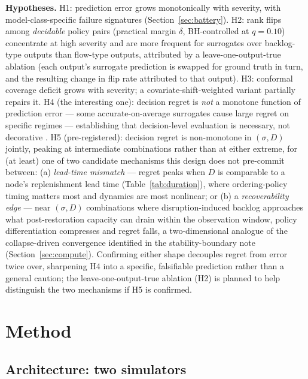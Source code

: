 \documentclass[12pt,a4paper]{article}
\begin{document}
\textbf{Hypotheses.} H1: prediction error grows monotonically with severity, with model-class-specific failure signatures (Section~\ref{sec:battery}). H2: rank flips among \emph{decidable} policy pairs (practical margin $\delta$, BH-controlled at $q=0.10$) concentrate at high severity and are more frequent for surrogates over backlog-type outputs than flow-type outputs, attributed by a leave-one-output-true ablation (each output's surrogate prediction is swapped for ground truth in turn, and the resulting change in flip rate attributed to that output). H3: conformal coverage deficit grows with severity; a covariate-shift-weighted variant \citep{tibshirani2019} partially repairs it. H4 (the interesting one): decision regret is \emph{not} a monotone function of prediction error --- some accurate-on-average surrogates cause large regret on specific regimes --- establishing that decision-level evaluation is necessary, not decorative \citep{shen2026}. H5 (pre-registered): decision regret is non-monotone in $(\sigma, D)$ jointly, peaking at intermediate combinations rather than at either extreme, for (at least) one of two candidate mechanisms this design does not pre-commit between: (a) \emph{lead-time mismatch} --- regret peaks when $D$ is comparable to a node's replenishment lead time (Table~\ref{tab:duration}), where ordering-policy timing matters most and dynamics are most nonlinear; or (b) a \emph{recoverability edge} --- near $(\sigma,D)$ combinations where disruption-induced backlog approaches what post-restoration capacity can drain within the observation window, policy differentiation compresses and regret falls, a two-dimensional analogue of the collapse-driven convergence identified in the stability-boundary note (Section~\ref{sec:compute}). Confirming either shape decouples regret from error twice over, sharpening H4 into a specific, falsifiable prediction rather than a general caution; the leave-one-output-true ablation (H2) is planned to help distinguish the two mechanisms if H5 is confirmed.

\section{Method}

\subsection{Architecture: two simulators}\label{sec:architecture}
\end{document}
